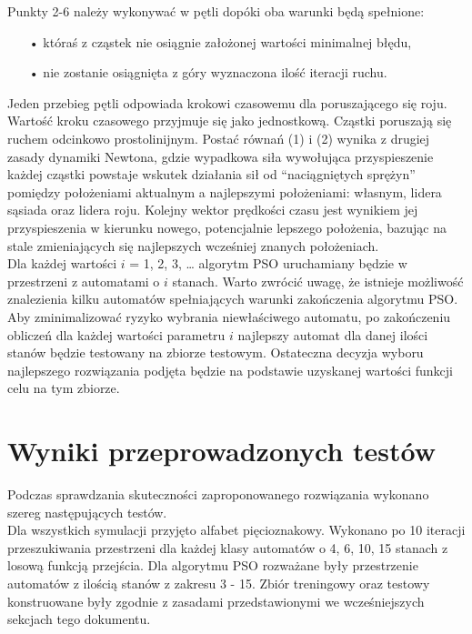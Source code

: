 \documentclass[runningheads,a4paper]{llncs}
\begin{document}
Punkty 2-6 należy wykonywać w pętli dopóki oba warunki będą spełnione:

\begin{itemize}
\item[•] któraś z cząstek nie osiągnie założonej wartości minimalnej błędu,
\item[•] nie zostanie osiągnięta z góry wyznaczona ilość iteracji ruchu.
\end{itemize}

Jeden przebieg pętli odpowiada krokowi czasowemu dla poruszającego się roju. Wartość kroku czasowego przyjmuje się jako jednostkową.
Cząstki poruszają się ruchem odcinkowo prostolinijnym. Postać równań (1) i (2) wynika z drugiej zasady dynamiki Newtona, gdzie wypadkowa siła wywołująca przyspieszenie każdej cząstki powstaje wskutek działania sił od “naciągniętych sprężyn” pomiędzy położeniami aktualnym a najlepszymi położeniami: własnym, lidera sąsiada oraz lidera roju. Kolejny wektor prędkości czasu jest wynikiem jej przyspieszenia w kierunku nowego, potencjalnie lepszego położenia, bazując na stale zmieniających się najlepszych wcześniej znanych położeniach.\\

Dla każdej wartości $i$ = 1, 2, 3, …  algorytm PSO uruchamiany będzie w przestrzeni z automatami o $i$ stanach. Warto zwrócić uwagę, że istnieje możliwość znalezienia kilku automatów spełniających warunki zakończenia algorytmu PSO. Aby zminimalizować ryzyko wybrania niewłaściwego automatu, po zakończeniu obliczeń dla każdej wartości parametru $i$ najlepszy automat dla danej ilości stanów będzie testowany na zbiorze testowym. Ostateczna decyzja wyboru najlepszego rozwiązania podjęta będzie na podstawie uzyskanej wartości funkcji celu na tym zbiorze.

\newpage

\FloatBarrier
\section{Wyniki przeprowadzonych testów}

Podczas sprawdzania skuteczności zaproponowanego rozwiązania wykonano szereg następujących testów. \\

Dla wszystkich symulacji przyjęto alfabet pięcioznakowy. Wykonano po 10 iteracji przeszukiwania przestrzeni dla każdej klasy automatów o 4, 6, 10, 15 stanach z losową funkcją przejścia. Dla algorytmu PSO rozważane były przestrzenie automatów z ilością stanów z zakresu 3 - 15. Zbiór treningowy oraz testowy konstruowane były zgodnie z zasadami przedstawionymi we wcześniejszych sekcjach tego dokumentu. \\
\end{document}
